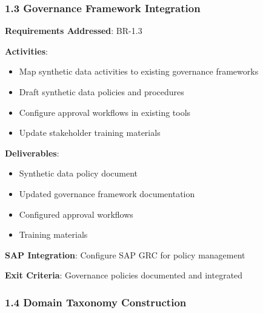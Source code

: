 \documentclass[12pt,a4paper,twoside]{report}
\begin{document}
\subsubsection{1.3 Governance Framework Integration}

\begin{tcolorbox}[colback=blue!5,colframe=blue!70,title=1.3 Governance Integration]
\textbf{Requirements Addressed}: BR-1.3

\textbf{Activities}:
\begin{itemize}
\item Map synthetic data activities to existing governance frameworks
\item Draft synthetic data policies and procedures
\item Configure approval workflows in existing tools
\item Update stakeholder training materials
\end{itemize}

\textbf{Deliverables}:
\begin{itemize}
\item Synthetic data policy document
\item Updated governance framework documentation
\item Configured approval workflows
\item Training materials
\end{itemize}

\textbf{SAP Integration}: Configure SAP GRC for policy management

\textbf{Exit Criteria}: Governance policies documented and integrated
\end{tcolorbox}

\subsubsection{1.4 Domain Taxonomy Construction}
\end{document}
